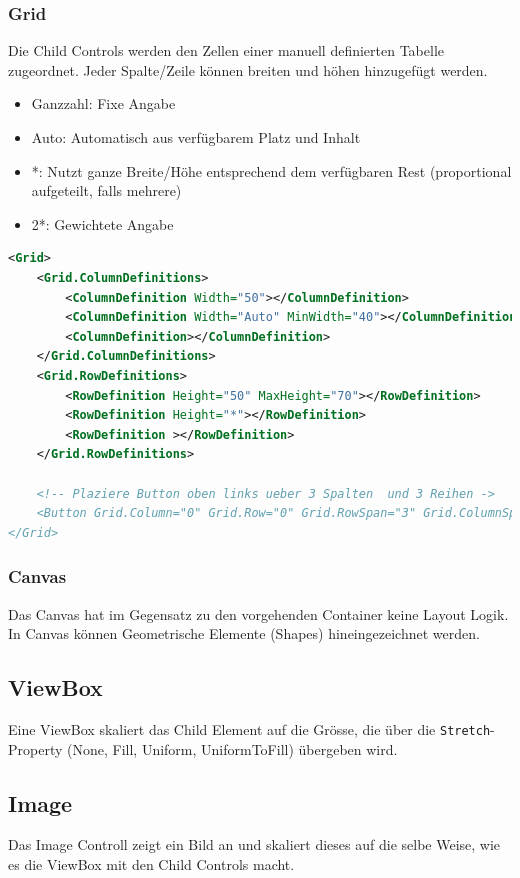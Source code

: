 \subsubsection{Grid}
Die Child Controls werden den Zellen einer manuell definierten Tabelle zugeordnet. Jeder Spalte/Zeile können breiten und höhen hinzugefügt werden. 
\begin{itemize}
	\item Ganzzahl: Fixe Angabe
	\item Auto: Automatisch aus verfügbarem Platz und Inhalt
	\item *: Nutzt ganze Breite/Höhe entsprechend dem verfügbaren Rest (proportional aufgeteilt, falls mehrere)
	\item 2*: Gewichtete Angabe
\end{itemize}
\begin{lstlisting}[caption=Grid, language=XML]
<Grid>
	<Grid.ColumnDefinitions>
		<ColumnDefinition Width="50"></ColumnDefinition>
		<ColumnDefinition Width="Auto" MinWidth="40"></ColumnDefinition>
		<ColumnDefinition></ColumnDefinition>
	</Grid.ColumnDefinitions>
	<Grid.RowDefinitions>
		<RowDefinition Height="50" MaxHeight="70"></RowDefinition>
		<RowDefinition Height="*"></RowDefinition>
		<RowDefinition ></RowDefinition>
	</Grid.RowDefinitions>
	
	<!-- Plaziere Button oben links ueber 3 Spalten  und 3 Reihen ->
	<Button Grid.Column="0" Grid.Row="0" Grid.RowSpan="3" Grid.ColumnSpan="3" />
</Grid>
\end{lstlisting}

\subsubsection{Canvas}
Das Canvas hat im Gegensatz zu den vorgehenden Container keine Layout Logik. In Canvas können Geometrische Elemente (Shapes) hineingezeichnet werden.


\subsection{ViewBox}
Eine ViewBox skaliert das Child Element auf die Grösse, die über die \lstinline|Stretch|-Property (None, Fill, Uniform, UniformToFill) übergeben wird.

\subsection{Image}
Das Image Controll zeigt ein Bild an und skaliert dieses auf die selbe Weise, wie es die ViewBox mit den Child Controls macht.

